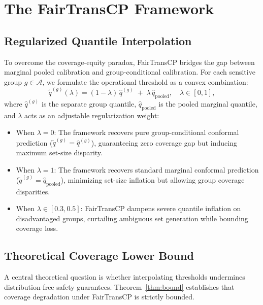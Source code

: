 \documentclass[conference]{IEEEtran}
\begin{document}
\section{The FairTransCP Framework}

\subsection{Regularized Quantile Interpolation}
To overcome the coverage-equity paradox, FairTransCP bridges the gap between marginal pooled calibration and group-conditional calibration. For each sensitive group $g \in \mathcal{A}$, we formulate the operational threshold as a convex combination:
\begin{equation}
\label{eq:interpolation}
\tilde{q}^{(g)}(\lambda) = (1 - \lambda)\,\hat{q}^{(g)} \;+\; \lambda\,\hat{q}_{\text{pooled}}, \quad \lambda \in [0, 1],
\end{equation}
where $\hat{q}^{(g)}$ is the separate group quantile, $\hat{q}_{\text{pooled}}$ is the pooled marginal quantile, and $\lambda$ acts as an adjustable regularization weight:
\begin{itemize}
    \item When $\lambda = 0$: The framework recovers pure group-conditional conformal prediction ($\tilde{q}^{(g)} = \hat{q}^{(g)}$), guaranteeing zero coverage gap but inducing maximum set-size disparity.
    \item When $\lambda = 1$: The framework recovers standard marginal conformal prediction ($\tilde{q}^{(g)} = \hat{q}_{\text{pooled}}$), minimizing set-size inflation but allowing group coverage disparities.
    \item When $\lambda \in [0.3, 0.5]$: FairTransCP dampens severe quantile inflation on disadvantaged groups, curtailing ambiguous set generation while bounding coverage loss.
\end{itemize}

\subsection{Theoretical Coverage Lower Bound}
A central theoretical question is whether interpolating thresholds undermines distribution-free safety guarantees. Theorem~\ref{thm:bound} establishes that coverage degradation under FairTransCP is strictly bounded.
\end{document}
